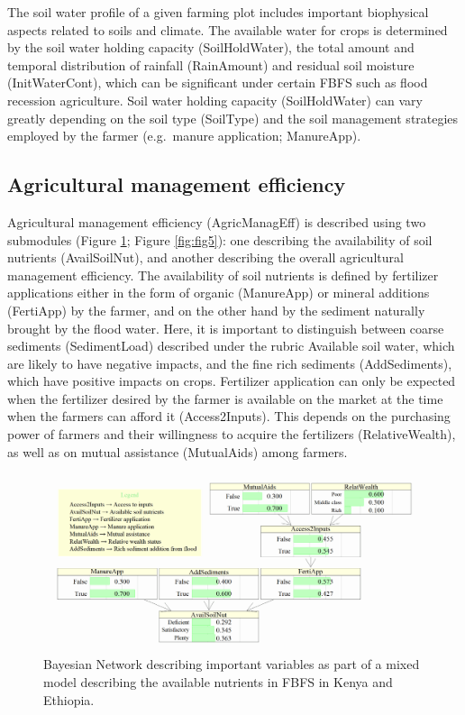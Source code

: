\documentclass[]{elsarticle} %
\begin{document}
The soil water profile of a given farming plot includes important biophysical aspects related to soils and climate. The available water for crops is determined by the soil water holding capacity (SoilHoldWater), the total amount and temporal distribution of rainfall (RainAmount) and residual soil moisture (InitWaterCont), which can be significant under certain FBFS such as flood recession agriculture. Soil water holding capacity (SoilHoldWater) can vary greatly depending on the soil type (SoilType) and the soil management strategies employed by the farmer (e.g.~manure application; ManureApp).

\hypertarget{refs13}{%
\subsection{Agricultural management efficiency}\label{refs13}}

Agricultural management efficiency (AgricManagEff) is described using two submodules (Figure \ref{fig:fig4}; Figure \ref{fig:fig5}): one describing the availability of soil nutrients (AvailSoilNut), and another describing the overall agricultural management efficiency. The availability of soil nutrients is defined by fertilizer applications either in the form of organic (ManureApp) or mineral additions (FertiApp) by the farmer, and on the other hand by the sediment naturally brought by the flood water. Here, it is important to distinguish between coarse sediments (SedimentLoad) described under the rubric Available soil water, which are likely to have negative impacts, and the fine rich sediments (AddSediments), which have positive impacts on crops. Fertilizer application can only be expected when the fertilizer desired by the farmer is available on the market at the time when the farmers can afford it (Access2Inputs). This depends on the purchasing power of farmers and their willingness to acquire the fertilizers (RelativeWealth), as well as on mutual assistance (MutualAids) among farmers.

\begin{figure}[!h]

{\centering \includegraphics[width=1\linewidth,]{figures/Modelling_FBFS_Available_soil_Nutrients_BNs_plot} 

}

\caption{Bayesian Network describing important variables as part of a mixed model describing the available nutrients in FBFS in Kenya and Ethiopia.}\label{fig:fig4}
\end{figure}
\end{document}
